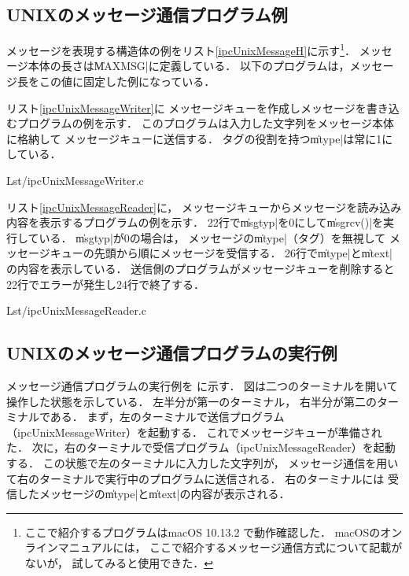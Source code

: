 \subsection{UNIXのメッセージ通信プログラム例}
メッセージを表現する構造体の例をリスト\ref{ipcUnixMessageH}に示す\footnote{
  ここで紹介するプログラムはmacOS 10.13.2 で動作確認した．
  macOSのオンラインマニュアルには，
  ここで紹介するメッセージ通信方式について記載がないが，
  試してみると使用できた．}．
メッセージ本体の長さは\|MAXMSG|に定義している．
以下のプログラムは，メッセージ長をこの値に固定した例になっている．



リスト\ref{ipcUnixMessageWriter}に
メッセージキューを作成しメッセージを書き込むプログラムの例を示す．
このプログラムは入力した文字列をメッセージ本体に格納して
メッセージキューに送信する．
タグの役割を持つ\|mtype|は常に1にしている．


                {Lst/ipcUnixMessageWriter.c}

リスト\ref{ipcUnixMessageReader}に，
メッセージキューからメッセージを読み込み内容を表示するプログラムの例を示す．
22行で\|msgtyp|を0にして\|msgrcv()|を実行している．
\|msgtyp|が0の場合は，
メッセージの\|mtype|（タグ）を無視して
メッセージキューの先頭から順にメッセージを受信する．
26行で\|mtype|と\|mtext|の内容を表示している．
送信側のプログラムがメッセージキューを削除すると
22行でエラーが発生し24行で終了する．


                {Lst/ipcUnixMessageReader.c}

\subsection{UNIXのメッセージ通信プログラムの実行例}
メッセージ通信プログラムの実行例を
に示す．
図は二つのターミナルを開いて操作した状態を示している．
左半分が第一のターミナル，
右半分が第二のターミナルである．
まず，左のターミナルで送信プログラム（ipcUnixMessageWriter）を起動する．
これでメッセージキューが準備された．
次に，右のターミナルで受信プログラム（ipcUnixMessageReader）を起動する．
この状態で左のターミナルに入力した文字列が，
メッセージ通信を用いて右のターミナルで実行中のプログラムに送信される．
右のターミナルには
受信したメッセージの\|mtype|と\|mtext|の内容が表示される．

